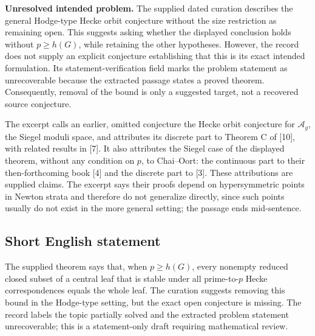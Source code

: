 \documentclass[11pt]{article}
\begin{document}
\textbf{Unresolved intended problem.} The supplied dated curation describes the general Hodge-type Hecke orbit conjecture without the size restriction as remaining open. This suggests asking whether the displayed conclusion holds without \(p\geq h(G)\), while retaining the other hypotheses. However, the record does not supply an explicit conjecture establishing that this is its exact intended formulation. Its statement-verification field marks the problem statement as unrecoverable because the extracted passage states a proved theorem. Consequently, removal of the bound is only a suggested target, not a recovered source conjecture.

The excerpt calls an earlier, omitted conjecture the Hecke orbit conjecture for \(\mathcal A_g\), the Siegel moduli space, and attributes its discrete part to Theorem C of [10], with related results in [7]. It also attributes the Siegel case of the displayed theorem, without any condition on \(p\), to Chai--Oort: the continuous part to their then-forthcoming book [4] and the discrete part to [3]. These attributions are supplied claims. The excerpt says their proofs depend on hypersymmetric points in Newton strata and therefore do not generalize directly, since such points usually do not exist in the more general setting; the passage ends mid-sentence.
\subsection{Short English statement}
The supplied theorem says that, when \(p\geq h(G)\), every nonempty reduced closed subset of a central leaf that is stable under all prime-to-\(p\) Hecke correspondences equals the whole leaf. The curation suggests removing this bound in the Hodge-type setting, but the exact open conjecture is missing. The record labels the topic partially solved and the extracted problem statement unrecoverable; this is a statement-only draft requiring mathematical review.
\end{document}
